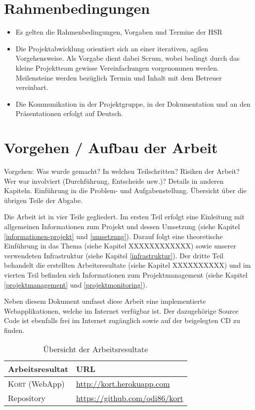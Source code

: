 \section{Rahmenbedingungen}
\begin{itemize}
\item Es gelten die Rahmenbedingungen, Vorgaben und Termine der HSR
\item Die Projektabwicklung orientiert sich an einer iterativen, agilen Vorgehensweise. Als Vorgabe dient dabei Scrum, wobei bedingt durch das kleine Projektteam gewisse Vereinfachungen vorgenommen werden. Meilensteine werden bezüglich Termin und Inhalt mit dem Betreuer vereinbart.
\item Die Kommunikation in der Projektgruppe, in der Dokumentation und an den Präsentationen erfolgt auf Deutsch.
\end{itemize}

\section{Vorgehen / Aufbau der Arbeit}
Vorgehen: Was wurde gemacht? In welchen Teilschritten? Risiken der Arbeit? Wer war involviert (Durchführung, Entscheide usw.)? Details in anderen Kapiteln.
Einführung in die Problem- und Aufgabenstellung. Übersicht über die übrigen Teile der Abgabe. 


Die Arbeit ist in vier Teile gegliedert. Im ersten Teil erfolgt eine Einleitung mit allgemeinen Informationen zum Projekt und dessen Umsetzung (siehe Kapitel \ref{informationen-projekt} und \ref{umsetzung}). Darauf folgt eine theoretische Einführung in das Thema (siehe Kapitel XXXXXXXXXXXX) sowie unserer verwendeten Infrastruktur (siehe Kapitel \ref{infrastruktur}). Der dritte Teil behandelt die erstellten Arbeitsresultate (siehe Kapitel XXXXXXXXXX) und im vierten Teil befinden sich Informationen zum Projektmanagement (siehe Kapitel \ref{projektmanagement} und \ref{projektmonitoring}).

Neben diesem Dokument umfasst diese Arbeit eine implementierte Webapplikationen, welche im Internet verfügbar ist. Der dazugehörige Source Code ist ebenfalls frei im Internet zugänglich sowie auf der beigelegten CD zu finden.

\begin{table}[H]
\centering
\begin{tabular}{|p{0.3\twocelltabwidth}|p{0.7\twocelltabwidth}|}
\hline 
\textbf{Arbeitsresultat} & \textbf{URL} \\ 
\hline 
\textsc{Kort} (WebApp) & \url{http://kort.herokuapp.com} \\ 
\hline 
Repository & \url{https://github.com/odi86/kort} \\ 
\hline 
\end{tabular}
\label{arbeitsresultate}
\caption{Übersicht der Arbeitsresultate}
\end{table} 
